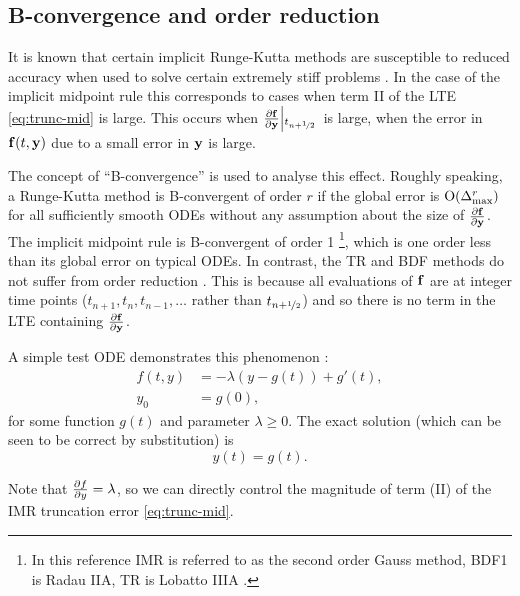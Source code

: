\subsection{B-convergence and order reduction}
\label{sec:order-reduction}

It is known that certain implicit Runge-Kutta methods are susceptible to reduced accuracy when used to solve certain extremely stiff problems \cite[156]{Atkinson1994} \cite[225]{HairerWanner}.
In the case of the implicit midpoint rule this corresponds to cases when term II of the LTE \cref{eq:trunc-mid} is large. 
This occurs when $\frac{\partial {\mathbf{f}}}{\partial \mathbf{y}}{\left|_{t_{n+\nicefrac{1}{2}}{}}\right.}$ is large, \ie when the error in ${\mathbf{f}{\left( t, \mathbf{y} \right)}}$ due to a small error in $\mathbf{y}$ is large.

The concept of ``B-convergence'' is used to analyse this effect.
Roughly speaking, a Runge-Kutta method is B-convergent of order $r$ if the global error is  $\text{O}{\left( \Delta_{\text{max}}^r \right)}$ for all sufficiently smooth ODEs without any assumption about the size of $\frac{\partial {\mathbf{f}}}{\partial \mathbf{y}}$.
The implicit midpoint rule is B-convergent of order 1 \cite[231]{HairerWanner}\footnote{In this reference IMR is referred to as the second order Gauss method, BDF1 is Radau IIA, TR is Lobatto IIIA \cite[72-76]{HairerWanner}.}, which is one order less than its global error on typical ODEs.
In contrast, the TR and BDF methods do not suffer from order reduction \cite[159]{Atkinson1994}.
This is because all evaluations of ${\mathbf{f}}$ are at integer time points (\ie $t_{n+1}, t_{n}, t_{n-1}, \ldots$ rather than $t_{n+\nicefrac{1}{2}}$) and so there is no term in the LTE containing $\frac{\partial {\mathbf{f}}}{\partial \mathbf{y}}$.

A simple test ODE demonstrates this phenomenon \cite[157]{Atkinson2009}:
\begin{equation}
  \begin{aligned}
    \label{eqn:imr-test-order-reduction}
    f(t, y) &= -\lambda (y - g(t)) + g'(t), \\
    y_0 &= g(0),
  \end{aligned}
\end{equation}
for some function $g(t)$ and parameter $\lambda \geq 0$.
The exact solution (which can be seen to be correct by substitution) is
\begin{equation}
  y(t) = g(t).
\end{equation}

Note that $\frac{\partial f}{\partial y} = \lambda$, so we can directly control the magnitude of term (II) of the IMR truncation error \eqref{eq:trunc-mid}.

